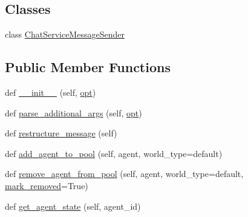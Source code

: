 \subsection*{Classes}
\begin{DoxyCompactItemize}
\item 
class \hyperlink{classparlai_1_1chat__service_1_1core_1_1chat__service__manager_1_1ChatServiceManager_1_1ChatServiceMessageSender}{Chat\+Service\+Message\+Sender}
\end{DoxyCompactItemize}
\subsection*{Public Member Functions}
\begin{DoxyCompactItemize}
\item 
def \hyperlink{classparlai_1_1chat__service_1_1core_1_1chat__service__manager_1_1ChatServiceManager_ac3c5275395694d74b18ff6d6f5e61f9d}{\+\_\+\+\_\+init\+\_\+\+\_\+} (self, \hyperlink{classparlai_1_1chat__service_1_1core_1_1chat__service__manager_1_1ChatServiceManager_a418cecffd5c3e0d6a00919eaa837d0e2}{opt})
\item 
def \hyperlink{classparlai_1_1chat__service_1_1core_1_1chat__service__manager_1_1ChatServiceManager_acf204463db3ea8e4a3929d5191890cbc}{parse\+\_\+additional\+\_\+args} (self, \hyperlink{classparlai_1_1chat__service_1_1core_1_1chat__service__manager_1_1ChatServiceManager_a418cecffd5c3e0d6a00919eaa837d0e2}{opt})
\item 
def \hyperlink{classparlai_1_1chat__service_1_1core_1_1chat__service__manager_1_1ChatServiceManager_a68e25213509b2bd287ae8a69fd9a726f}{restructure\+\_\+message} (self)
\item 
def \hyperlink{classparlai_1_1chat__service_1_1core_1_1chat__service__manager_1_1ChatServiceManager_a496b0f51b79bc2cd1a9be8fdc4cdd93d}{add\+\_\+agent\+\_\+to\+\_\+pool} (self, agent, world\+\_\+type=\textquotesingle{}default\textquotesingle{})
\item 
def \hyperlink{classparlai_1_1chat__service_1_1core_1_1chat__service__manager_1_1ChatServiceManager_a926a7c35369cb78cc81839cf2c7c1321}{remove\+\_\+agent\+\_\+from\+\_\+pool} (self, agent, world\+\_\+type=\textquotesingle{}default\textquotesingle{}, \hyperlink{classparlai_1_1chat__service_1_1core_1_1chat__service__manager_1_1ChatServiceManager_acd647091b75f07e2d3744b0d895c9d8c}{mark\+\_\+removed}=True)
\item 
def \hyperlink{classparlai_1_1chat__service_1_1core_1_1chat__service__manager_1_1ChatServiceManager_ac88107eb2a55878dad8ceb4c90acff5b}{get\+\_\+agent\+\_\+state} (self, agent\+\_\+id)

\end{DoxyCompactItemize}
